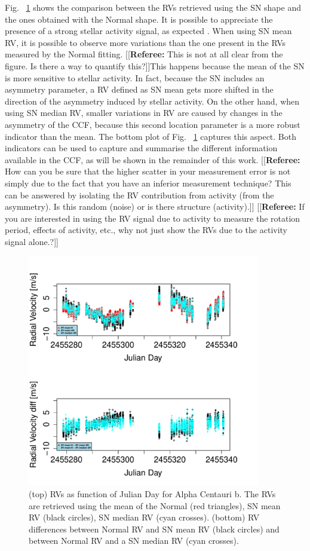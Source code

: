 \documentclass[11pt, oneside]{article}
\newcommand{\comment}[1]{{\color{red}[[\textbf{Referee: }#1]]}}
\begin{document}
Fig.~ \ref{fig:alphacent:diff:RV} shows the comparison between the RVs retrieved using the SN shape and the ones obtained with the Normal shape. It is possible to appreciate the presence of a strong stellar activity signal, as expected \citep{Dumusque-2012,Thompson-2017}. When using SN mean RV, it is possible to observe more variations than the one present in the RVs measured by the Normal fitting. \comment{This is not at all clear from the figure. Is there a way to quantify this?}This happens because the mean of the SN is more sensitive to stellar activity. In fact, because the SN includes an asymmetry parameter, a RV defined as SN mean gets more shifted in the direction of the asymmetry induced by stellar activity. On the other hand, when using SN median RV, smaller variations in RV are caused by changes in the asymmetry of the CCF, because this second location parameter is a more robust indicator than the mean. The bottom plot of Fig.~ \ref{fig:alphacent:diff:RV} captures this aspect. Both indicators can be used to capture and summarise the different information available in the CCF, as will be shown in the remainder of this work. \comment{How can you be sure that the higher scatter in your measurement error is not simply due to the fact that you have an inferior measurement technique? This can be answered by isolating the RV contribution from activity (from the asymmetry). Is this random (noise) or is there structure (activity).} \comment{If you are interested in using the RV signal due to activity to measure the rotation period, effects of activity, etc., why not just show the RVs due to the activity signal alone.?}
%
\begin{figure}[htbp]
   \centering
\includegraphics[height = 4in]{HD12862_[2]RadialVelocityDifferences.pdf} 
   \caption{(top) RVs as function of Julian Day for Alpha Centauri b. The RVs are retrieved using the mean of the Normal (red triangles), SN mean RV (black circles), SN median RV (cyan crosses). (bottom) RV differences between Normal RV and SN mean RV (black circles) and between Normal RV and a SN median RV (cyan crosses).}
   \label{fig:alphacent:diff:RV}
\end{figure}
%
\end{document}
